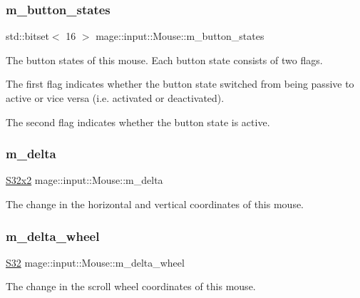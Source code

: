 \subsubsection{\texorpdfstring{m\+\_\+button\+\_\+states}{m\_button\_states}}
{\footnotesize\ttfamily std\+::bitset$<$ 16 $>$ mage\+::input\+::\+Mouse\+::m\+\_\+button\+\_\+states\hspace{0.3cm}{\ttfamily [private]}}

The button states of this mouse. Each button state consists of two flags.

The first flag indicates whether the button state switched from being passive to active or vice versa (i.\+e. activated or deactivated).

The second flag indicates whether the button state is active. \mbox{\label{classmage_1_1input_1_1_mouse_ac2e7872b793012d52c9f1b1b1206f6d6}} 
\subsubsection{\texorpdfstring{m\+\_\+delta}{m\_delta}}
{\footnotesize\ttfamily \mbox{\hyperlink{namespacemage_aad06aca0b442d3b41653eafed822d571}{S32x2}} mage\+::input\+::\+Mouse\+::m\+\_\+delta\hspace{0.3cm}{\ttfamily [private]}}

The change in the horizontal and vertical coordinates of this mouse. \mbox{\label{classmage_1_1input_1_1_mouse_ab71a69d6a727b67065643d5dc929ee33}} 
\subsubsection{\texorpdfstring{m\+\_\+delta\+\_\+wheel}{m\_delta\_wheel}}
{\footnotesize\ttfamily \mbox{\hyperlink{namespacemage_a2ef1a005a77358f1825d13fd481b557f}{S32}} mage\+::input\+::\+Mouse\+::m\+\_\+delta\+\_\+wheel\hspace{0.3cm}{\ttfamily [private]}}

The change in the scroll wheel coordinates of this mouse. \mbox{\label{classmage_1_1input_1_1_mouse_a35e656946a3cbb7253abaeeec30642df}} 
